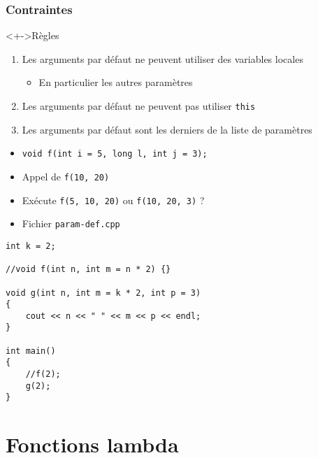 \begin{frame}
\frametitle{Contraintes}
\begin{alertblock}<+->{Règles}
	\begin{enumerate}[<+->]
	\item Les arguments par défaut ne peuvent utiliser des variables locales
		\begin{itemize}
		\item En particulier les autres paramètres
		\end{itemize}
	\item Les arguments par défaut ne peuvent pas utiliser \lstinline|this|
	\item Les arguments par défaut sont les derniers de la liste de paramètres
	\end{enumerate}
\end{alertblock}
\begin{itemize}[<+->]
\item \lstinline|void f(int i = 5, long l, int j = 3);|
\item Appel de \texttt{f(10, 20)}
\item Exécute \texttt{f(5, 10, 20)} ou \texttt{f(10, 20, 3)} ?
\end{itemize}
\end{frame}

\begin{frame}[containsverbatim]
\begin{itemize}
\item Fichier \texttt{param-def.cpp}
\end{itemize}
\begin{lstlisting}
int k = 2;

//void f(int n, int m = n * 2) {}

void g(int n, int m = k * 2, int p = 3)
{
	cout << n << " " << m << p << endl;
}

int main()
{	
	//f(2);
	g(2);
}
\end{lstlisting}
\end{frame}

\section{Fonctions lambda}

